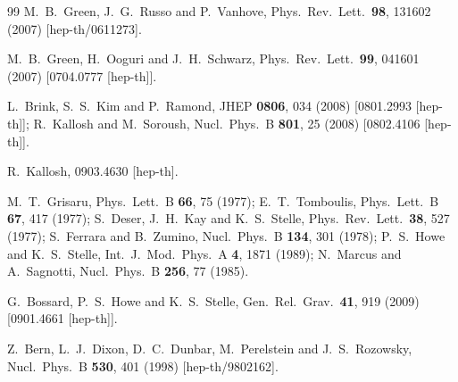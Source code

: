 \documentclass[aps,prl,twocolumn,groupedaddress,draft,showpacs,nofootinbib]{revtex4}
\begin{document}
\begin{thebibliography}{99}
M.~B.~Green, J.~G.~Russo and P.~Vanhove,
Phys.\ Rev.\ Lett.\  {\bf 98}, 131602 (2007)
[hep-th/0611273].

M.~B.~Green, H.~Ooguri and J.~H.~Schwarz,
Phys.\ Rev.\ Lett.\  {\bf 99}, 041601 (2007)
[0704.0777 [hep-th]].

L.~Brink, S.~S.~Kim and P.~Ramond,
JHEP {\bf 0806}, 034 (2008)
[0801.2993 [hep-th]];
R.~Kallosh and M.~Soroush,
Nucl.\ Phys.\  B {\bf 801}, 25 (2008)
[0802.4106 [hep-th]].

R.~Kallosh,
0903.4630 [hep-th].

M.~T.~Grisaru,
Phys.\ Lett.\  B {\bf 66}, 75 (1977);
%
E.~T.~Tomboulis,
Phys.\ Lett.\  B {\bf 67}, 417 (1977);
%
S.~Deser, J.~H.~Kay and K.~S.~Stelle,
Phys.\ Rev.\ Lett.\  {\bf 38}, 527 (1977);
%
S.~Ferrara and B.~Zumino,
Nucl.\ Phys.\  B {\bf 134}, 301 (1978);
%
P.~S.~Howe and K.~S.~Stelle,
Int.\ J.\ Mod.\ Phys.\ A {\bf 4}, 1871 (1989);
%
N.~Marcus and A.~Sagnotti,
Nucl.\ Phys.\  B {\bf 256}, 77 (1985).

G.~Bossard, P.~S.~Howe and K.~S.~Stelle,
Gen.\ Rel.\ Grav.\  {\bf 41}, 919 (2009)
[0901.4661 [hep-th]].

Z.~Bern, L.~J.~Dixon, D.~C.~Dunbar, M.~Perelstein and J.~S.~Rozowsky,
Nucl.\ Phys.\ B {\bf 530}, 401 (1998)
[hep-th/9802162].


\end{thebibliography}
\end{document}
